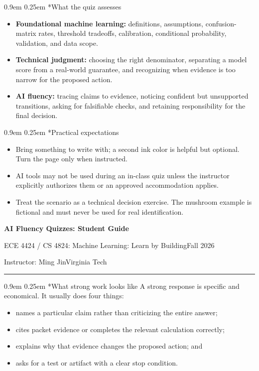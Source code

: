 \documentclass[10pt]{article}
\makeatletter
\newcommand{\CourseCodes}{ECE 4424 / CS 4824}
\newcommand{\CourseName}{Machine Learning: Learn by Building}
\newcommand{\CourseTerm}{Fall 2026}
\newcommand{\InstructorName}{Ming Jin}
\renewcommand\section{\@startsection{section}{1}{\z@}%
  {0.9em}%
  {0.25em}%
  {\normalfont\large\bfseries}}
\newcommand{\GuideHeader}{%
  {\LARGE\bfseries AI Fluency Quizzes: Student Guide}\par
  \vspace{0.25em}
  \CourseCodes: \CourseName\hfill\CourseTerm\par
  Instructor: \InstructorName\hfill Virginia Tech
  \vspace{0.4em}\hrule\vspace{0.55em}
}
\makeatother
\begin{document}
\section*{What the quiz assesses}
\begin{itemize}
  \item \textbf{Foundational machine learning:} definitions, assumptions, confusion-matrix rates, threshold tradeoffs, calibration, conditional probability, validation, and data scope.
  \item \textbf{Technical judgment:} choosing the right denominator, separating a model score from a real-world guarantee, and recognizing when evidence is too narrow for the proposed action.
  \item \textbf{AI fluency:} tracing claims to evidence, noticing confident but unsupported transitions, asking for falsifiable checks, and retaining responsibility for the final decision.
\end{itemize}

\section*{Practical expectations}
\begin{itemize}
  \item Bring something to write with; a second ink color is helpful but optional. Turn the page only when instructed.
  \item AI tools may not be used during an in-class quiz unless the instructor explicitly authorizes them or an approved accommodation applies.
  \item Treat the scenario as a technical decision exercise. The mushroom example is fictional and must never be used for real identification.
\end{itemize}

\newpage
\GuideHeader

\section*{What strong work looks like}
A strong response is specific and economical. It usually does four things:

\begin{itemize}
  \item names a particular claim rather than criticizing the entire answer;
  \item cites packet evidence or completes the relevant calculation correctly;
  \item explains why that evidence changes the proposed action; and
  \item asks for a test or artifact with a clear stop condition.
\end{itemize}
\end{document}
